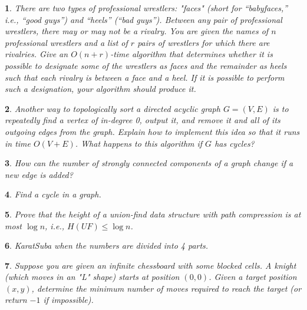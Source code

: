 \documentclass[%
addpoints]{exam}
\theoremstyle{problem}
\newtheorem{p}{}
\begin{document}
\begin{p} 
There are two types of professional wrestlers: "faces" (short for “babyfaces,” i.e., “good guys”) and “heels” (“bad guys”). Between any pair of professional wrestlers, there may or may not be a rivalry. You are given the names of \( n \) professional wrestlers and a list of \( r \) pairs of wrestlers for which there are rivalries. Give an \( O(n + r) \)-time algorithm that determines whether it is possible to designate some of the wrestlers as faces and the remainder as heels such that each rivalry is between a face and a heel. If it is possible to perform such a designation, your algorithm should produce it.  
\hfill  
\end{p}

\begin{p} 
Another way to topologically sort a directed acyclic graph \( G = (V, E) \) is to repeatedly find a vertex of in-degree 0, output it, and remove it and all of its outgoing edges from the graph. Explain how to implement this idea so that it runs in time \( O(V + E) \). What happens to this algorithm if \( G \) has cycles?  
\hfill  
\end{p}

\begin{p} 
How can the number of strongly connected components of a graph change if a new edge is added?  
\hfill  
\end{p}

\begin{p}
Find a cycle in a graph.  
\hfill
\end{p}

\begin{p}
Prove that the height of a union-find data structure with path compression is at most $\log n$, i.e., $H(UF) \leq \log n$.  
\hfill
\end{p}

\begin{p}
KaratSuba when the numbers are divided into 4 parts.
\hfill\end{p}

\begin{p}
Suppose you are given an infinite chessboard with some blocked cells. A knight (which moves in an "L" shape) starts at position $(0,0)$. Given a target position $(x, y)$, determine the minimum number of moves required to reach the target (or return $-1$ if impossible).
\hfill\end{p}
\end{document}
